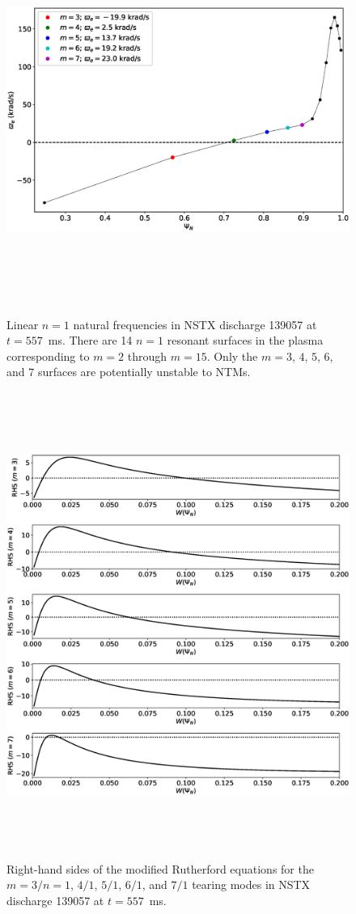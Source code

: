 \documentclass[12pt,prb,aps]{revtex4-1}
\begin{document}
\begin{figure}
\centerline{\includegraphics[height=5in]{Fig13.eps}}
\caption{Linear $n=1$ natural frequencies in NSTX discharge 139057 at $t=557$\, ms. There are 14 $n=1$ resonant surfaces in the plasma corresponding to $m=2$ through $m=15$. Only the $m=3$, $4$, $5$, $6$, and $7$ surfaces are potentially
unstable to NTMs.}\label{fig13}
\end{figure}

\begin{figure}
\centerline{\includegraphics[height=6in]{Fig14.eps}}
\caption{Right-hand sides of the modified Rutherford equations for the $m=3/n=1$, $4/1$, $5/1$, $6/1$, and $7/1$ tearing modes in NSTX discharge 139057 at $t=557$\, ms.}\label{fig14}
\end{figure}
\end{document}
